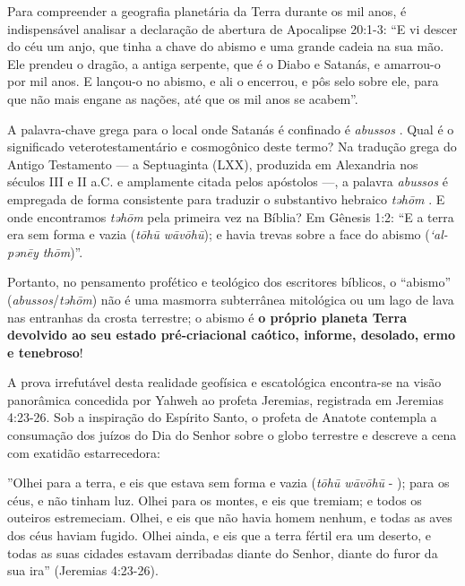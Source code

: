 \documentclass[11pt,a4paper,openany]{book}
\begin{document}
Para compreender a geografia planetária da Terra durante os mil anos, é indispensável analisar a declaração de abertura de Apocalipse 20:1-3:
``E vi descer do céu um anjo, que tinha a chave do abismo e uma grande cadeia na sua mão. Ele prendeu o dragão, a antiga serpente, que é o Diabo e Satanás, e amarrou-o por mil anos. E lançou-o no abismo, e ali o encerrou, e pôs selo sobre ele, para que não mais engane as nações, até que os mil anos se acabem''.

A palavra-chave grega para o local onde Satanás é confinado é \textit{abussos} .
Qual é o significado veterotestamentário e cosmogônico deste termo?
Na tradução grega do Antigo Testamento — a Septuaginta (LXX), produzida em Alexandria nos séculos III e II a.C. e amplamente citada pelos apóstolos —, a palavra \textit{abussos} é empregada de forma consistente para traduzir o substantivo hebraico \textit{təhōm} .
E onde encontramos \textit{təhōm} pela primeira vez na Bíblia? Em Gênesis 1:2:
``E a terra era sem forma e vazia (\textit{tōhū wāvōhū}); e havia trevas sobre a face do abismo (\textit{‘al-pənēy thōm})''.

Portanto, no pensamento profético e teológico dos escritores bíblicos, o ``abismo'' (\textit{abussos}/\textit{təhōm}) não é uma masmorra subterrânea mitológica ou um lago de lava nas entranhas da crosta terrestre; o abismo é \textbf{o próprio planeta Terra devolvido ao seu estado pré-criacional caótico, informe, desolado, ermo e tenebroso}!

A prova irrefutável desta realidade geofísica e escatológica encontra-se na visão panorâmica concedida por Yahweh ao profeta Jeremias, registrada em Jeremias 4:23-26. Sob a inspiração do Espírito Santo, o profeta de Anatote contempla a consumação dos juízos do Dia do Senhor sobre o globo terrestre e descreve a cena com exatidão estarrecedora:

''Olhei para a terra, e eis que estava sem forma e vazia (\textit{tōhū wāvōhū} - ); para os céus, e não tinham luz.
Olhei para os montes, e eis que tremiam; e todos os outeiros estremeciam.
Olhei, e eis que não havia homem nenhum, e todas as aves dos céus haviam fugido.
Olhei ainda, e eis que a terra fértil era um deserto, e todas as suas cidades estavam derribadas diante do Senhor, diante do furor da sua ira'' (Jeremias 4:23-26).
\end{document}
